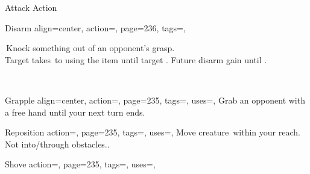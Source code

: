 \begin{PageBack}
\begin{Tables}{\backTableHeight}
\begin{Table}{Attack Action}
            \begin{entry}{Disarm}{%
                align=center,
                action=,
                page=236,
                tags=\Attack,
            }
                \begin{minipage}{0.8\linewidth}
                    \AthleticsReflex[tags={T}] \dash\,Knock something out of an opponent's grasp.\\
                    Target takes \,\Cirm to using the item until target . Future disarm gain  \Cirm
                    until .
                \end{minipage}\hfill
                \begin{minipage}{0.2\linewidth}
                    \raggedleft
                    \\
                \end{minipage}
            \end{entry}
            \begin{entry}{Grapple}{%
                align=center,
                action=,
                page=235,
                tags=\Attack,
                uses=\AthleticsFortitude,
            }
                Grab an opponent with a free hand until your next turn ends. \hfill{}\\
                \hspace{10.5ex}\hfill{}
            \end{entry}
            \begin{entry}{Reposition}{%
                action=,
                page=235,
                tags=\Attack,
                uses=\AthleticsFortitude,
            }
                Move creature \,\Feet within your reach. Not into/through obstacles.\hfill {}.
            \end{entry}
            \begin{entry}{Shove}{%
                action=,
                page=235,
                tags=\Attack,
                uses=\AthleticsFortitude,
            }

\end{entry}
\end{Table}
\end{Tables}
\end{PageBack}
